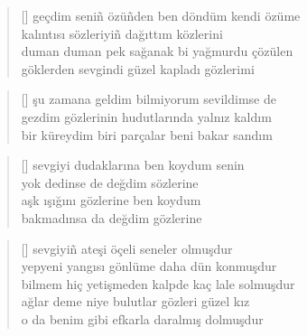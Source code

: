 \documentclass[10pt, openright, twoside]{memoir}
\theoremstyle{definition}
\begin{document}
\vspace*{\fill}
%
\newpage
{}
\vspace*{\fill}
\settowidth{\versewidth}{geçdim seni\~n özü\~nden ben döndüm kendi özüme}
\begin{verse}[\versewidth]
  geçdim seni\~n özü\~nden ben döndüm kendi özüme \\
  kalıntısı sözleriyi\~n dağıttım közlerini \\
  duman duman pek sağanak bi yağmurdu çözülen \\
  göklerden sevgindi güzel kapladı gözlerimi \\
\end{verse}
\vspace*{\fill}
%
\newpage
{}
\vspace*{\fill}
\settowidth{\versewidth}{gezdim gözlerinin hudutlarında yalnız kaldım}
\begin{verse}[\versewidth]
  şu zamana geldim bilmiyorum sevildimse de \\
  gezdim gözlerinin hudutlarında yalnız kaldım \\
  bir küreydim biri parçalar beni bakar sandım \\
\end{verse}
\vspace*{\fill}
%
\newpage
{}
\vspace*{\fill}
\settowidth{\versewidth}{sevgiyi dudaklarına ben koydum senin}
\begin{verse}[\versewidth]
  sevgiyi dudaklarına ben koydum senin \\
  yok dedinse de değdim sözlerine \\
  aşk ışığını gözlerine ben koydum \\
  bakmadınsa da değdim gözlerine \\
\end{verse}
\vspace*{\fill}
%
\newpage
{}
\vspace*{\fill}
\settowidth{\versewidth}{bilmem hiç yetişmeden kalpde kaç lale solmuşdur}
\begin{verse}[\versewidth]
  sevgiyi\~n ateşi öçeli seneler olmuşdur \\
  yepyeni yangısı gönlüme daha dün konmuşdur \\
  bilmem hiç yetişmeden kalpde kaç lale solmuşdur \\
  ağlar deme niye bulutlar gözleri güzel kız \\
  o da benim gibi efkarla daralmış dolmuşdur \\
\end{verse}
\end{document}
